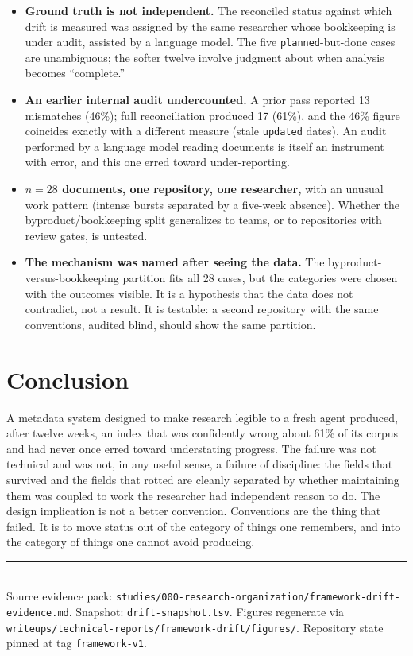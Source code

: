\documentclass[11pt]{article}
\begin{document}
\begin{itemize}[topsep=3pt,itemsep=1pt]
  \item \textbf{Ground truth is not independent.} The reconciled status
        against which drift is measured was assigned by the same researcher
        whose bookkeeping is under audit, assisted by a language model. The
        five \texttt{planned}-but-done cases are unambiguous; the softer
        twelve involve judgment about when analysis becomes ``complete.''
  \item \textbf{An earlier internal audit undercounted.} A prior pass
        reported 13 mismatches (46\%); full reconciliation produced 17
        (61\%), and the 46\% figure coincides exactly with a different
        measure (stale \texttt{updated} dates). An audit performed by a
        language model reading documents is itself an instrument with error,
        and this one erred toward under-reporting.
  \item \textbf{$n=28$ documents, one repository, one researcher,} with an
        unusual work pattern (intense bursts separated by a five-week
        absence). Whether the byproduct/bookkeeping split generalizes to
        teams, or to repositories with review gates, is untested.
  \item \textbf{The mechanism was named after seeing the data.} The
        byproduct-versus-bookkeeping partition fits all 28 cases, but the
        categories were chosen with the outcomes visible. It is a hypothesis
        that the data does not contradict, not a result. It is testable: a
        second repository with the same conventions, audited blind, should
        show the same partition.
\end{itemize}

\section{Conclusion}

A metadata system designed to make research legible to a fresh agent
produced, after twelve weeks, an index that was confidently wrong about 61\%
of its corpus and had never once erred toward understating progress. The
failure was not technical and was not, in any useful sense, a failure of
discipline: the fields that survived and the fields that rotted are cleanly
separated by whether maintaining them was coupled to work the researcher had
independent reason to do. The design implication is not a better convention.
Conventions are the thing that failed. It is to move status out of the
category of things one remembers, and into the category of things one cannot
avoid producing.

\vfill
\noindent\rule{\textwidth}{0.4pt}\\
\footnotesize
Source evidence pack:
\texttt{studies/000-research-organization/framework-drift-evidence.md}.
Snapshot: \texttt{drift-snapshot.tsv}. Figures regenerate via
\texttt{writeups/technical-reports/framework-drift/figures/}. Repository
state pinned at tag \texttt{framework-v1}.
\end{document}
